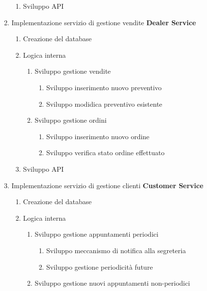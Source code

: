 \documentclass{article}
\begin{document}
\begin{enumerate}
\begin{enumerate}
        \item Sviluppo API
    \end{enumerate}
    \item Implementazione servizio di gestione vendite \textbf{Dealer Service}
    \begin{enumerate}
        \item Creazione del database
        \item Logica interna
        \begin{enumerate}
            \item Sviluppo gestione vendite
            \begin{enumerate}
                \item Sviluppo inserimento nuovo preventivo
                \item Sviluppo modidica preventivo esistente
            \end{enumerate}
            \item Sviluppo gestione ordini
            \begin{enumerate}
                \item Sviluppo inserimento nuovo ordine
                \item Sviluppo verifica stato ordine effettuato
            \end{enumerate}
        \end{enumerate}
        \item Sviluppo API
    \end{enumerate}
    \item Implementazione servizio di gestione clienti \textbf{Customer Service}
    \begin{enumerate}
        \item Creazione del database
        \item Logica interna
            \begin{enumerate}
                \item Sviluppo gestione appuntamenti periodici
                \begin{enumerate}
                    \item Sviluppo meccanismo di notifica alla segreteria
                    \item Sviluppo gestione periodicità future 
                \end{enumerate}
                \item Sviluppo gestione nuovi appuntamenti non-periodici
            \end{enumerate} 

\end{enumerate}
\end{enumerate}
\end{document}
